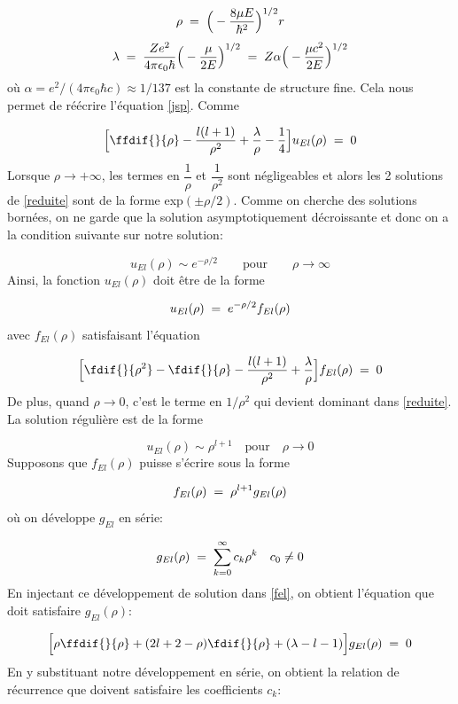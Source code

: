 \[
    \rho\; = \;\Big(-\dfrac{8\mu E}{\hbar^2}\Big)^{1/2}r
\]
\begin{equation}
    \lambda\; = \;\dfrac{Ze^2}{4\pi\epsilon_0 \hbar}\Big(-\dfrac{\mu}{2E}\Big)^{1/2}\; = \; Z\alpha\Big(-\dfrac{\mu c^2}{2E}\Big)^{1/2}
    \label{lambda}
\end{equation}
où $\alpha=e^2/(4\pi\epsilon_0 \hbar c) \approx 1/137$ est la constante de structure fine.
Cela nous permet de réécrire l'équation \eqref{jsp}. Comme

\begin{equation}
    \Big[\ffdif{}{\rho}-\dfrac{l(l+1)}{\rho^2}+\dfrac{\lambda}{\rho}-\dfrac{1}{4}\Big]u_{El}(\rho)\eq0
    \label{reduite}
\end{equation}
Lorsque $\rho \rightarrow +\infty$, les termes en $\dfrac{1}{\rho}$ et $\dfrac{1}{\rho^2}$ sont négligeables et alors les 2 solutions de \eqref{reduite} sont de la forme exp$(\pm \rho/2)$. Comme on cherche des solutions bornées, on ne garde que la solution asymptotiquement décroissante et donc on a la condition suivante sur notre solution:

\[
    u_{El}(\rho)\sim e^{-\rho/2} \qquad \text{pour} \qquad \rho \longrightarrow \infty
\]
Ainsi, la fonction $u_{El}(\rho)$ doit être de la forme

\[
    u_{El}(\rho)\; = \; e^{-\rho/2}f_{El}(\rho)
\]
avec $f_{El}(\rho)$ satisfaisant l'équation

\begin{equation}
    \Big[\fdif{}{\rho^2}-\fdif{}{\rho}-\dfrac{l(l+1)}{\rho^2}+\dfrac{\lambda}{\rho}\Big]f_{El}(\rho)\eq0
    \label{fel}
\end{equation}
De plus, quand $\rho \longrightarrow 0$, c'est le terme en $1/\rho^2$ qui devient dominant dans \eqref{reduite}. La solution régulière est de la forme

\[
    u_{El}(\rho) \sim \rho^{l+1} \quad \text{pour} \quad \rho \longrightarrow 0
\]
 Supposons que $f_{El}(\rho)$ puisse s'écrire sous la forme

\[
    f_{El}(\rho)\; = \;\rho^{l+1}g_{El}(\rho)
\]
où on développe $g_{El}$ en série:

\[
    g_{El}(\rho)\; = \;\sum_{k=0}^{\infty} c_k\rho^k \quad c_0 \neq 0
\]
En injectant ce développement de solution dans \eqref{fel}, on obtient l'équation que doit satisfaire $g_{El}(\rho)$:

\begin{equation}
    \Big[\rho\ffdif{}{\rho}+(2l+2-\rho)\fdif{}{\rho}+(\lambda-l-1)\Big]g_{El}(\rho)\eq0
    \label{gel}
\end{equation}
En y substituant notre développement en série, on obtient la relation de récurrence que doivent satisfaire les coefficients $c_k$:

